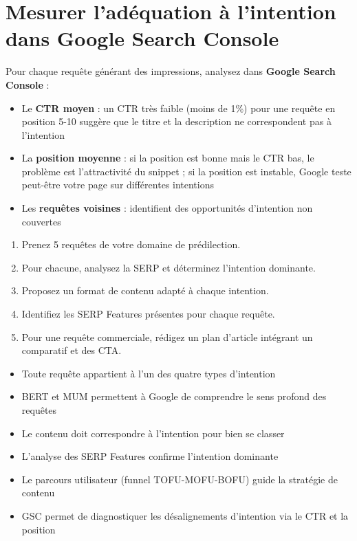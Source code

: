 \documentclass[12pt,a4paper,twoside]{report}
\newcommand{\keyword}[1]{\textbf{\textcolor{googleblue}{#1}}}
\begin{document}
\section{Mesurer l'adéquation à l'intention dans Google Search Console}

Pour chaque requête générant des impressions, analysez dans \keyword{Google Search Console} :

\begin{itemize}
    \item Le \keyword{CTR moyen} : un CTR très faible (moins de 1\%) pour une requête en position 5-10 suggère que le titre et la description ne correspondent pas à l'intention
    \item La \keyword{position moyenne} : si la position est bonne mais le CTR bas, le problème est l'attractivité du snippet ; si la position est instable, Google teste peut-être votre page sur différentes intentions
    \item Les \keyword{requêtes voisines} : identifient des opportunités d'intention non couvertes
\end{itemize}

\begin{exercise}
\begin{enumerate}
    \item Prenez 5 requêtes de votre domaine de prédilection.
    \item Pour chacune, analysez la SERP et déterminez l'intention dominante.
    \item Proposez un format de contenu adapté à chaque intention.
    \item Identifiez les SERP Features présentes pour chaque requête.
    \item Pour une requête commerciale, rédigez un plan d'article intégrant un comparatif et des CTA.
\end{enumerate}
\end{exercise}

\begin{takeaways}
\begin{itemize}
    \item Toute requête appartient à l'un des quatre types d'intention
    \item BERT et MUM permettent à Google de comprendre le sens profond des requêtes
    \item Le contenu doit correspondre à l'intention pour bien se classer
    \item L'analyse des SERP Features confirme l'intention dominante
    \item Le parcours utilisateur (funnel TOFU-MOFU-BOFU) guide la stratégie de contenu
    \item GSC permet de diagnostiquer les désalignements d'intention via le CTR et la position
\end{itemize}
\end{takeaways}
\end{document}
